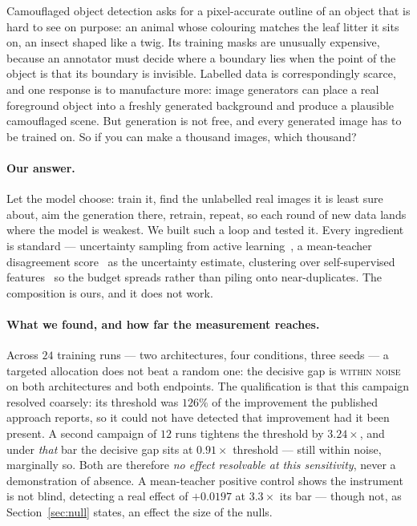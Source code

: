 \documentclass{article} %
\begin{document}
Camouflaged object detection asks for a pixel-accurate outline of an object that is hard to see on
purpose: an animal whose colouring matches the leaf litter it sits on, an insect shaped like a twig.
Its training masks are unusually expensive, because an annotator must decide where a boundary lies
when the point of the object is that its boundary is invisible. Labelled data is correspondingly
scarce, and one response is to manufacture more: image generators can place a real foreground object
into a freshly generated background and produce a plausible camouflaged scene. But generation
is not free, and every generated image has to be trained on. So if you can make a thousand images,
which thousand?

\paragraph{Our answer.} Let the model choose: train it, find the unlabelled real images it is least
sure about, aim the generation there, retrain, repeat, so each round of new data lands where the
model is weakest. We built such a loop and tested it. Every ingredient is standard --- uncertainty
sampling from active learning~\cite{settles2009active}, a mean-teacher disagreement score~\cite{tarvainen2017mean} as the uncertainty estimate,
clustering over self-supervised features~\cite{oquab2024dinov2,radford2021learning} so the budget spreads rather than piling onto
near-duplicates. The composition is ours, and it does not work.

\paragraph{What we found, and how far the measurement reaches.} Across $24$ training runs --- two
architectures, four conditions, three seeds --- a targeted allocation does not beat a random one:
the decisive gap is \textsc{within noise} on both architectures and both endpoints. The
qualification is that this campaign resolved coarsely: its threshold was $126\%$ of the improvement
the published approach reports, so it could not have detected that improvement had it been present.
A second campaign of $12$ runs tightens the threshold by $3.24\times$, and under \emph{that} bar the
decisive gap sits at $0.91\times$ threshold --- still within noise, marginally so. Both are therefore
\emph{no effect resolvable at this sensitivity}, never a demonstration of absence. A mean-teacher
positive control shows the instrument is not blind, detecting a real effect of $+0.0197$ at
$3.3\times$ its bar --- though not, as Section~\ref{sec:null} states, an effect the size of the
nulls.
\end{document}
